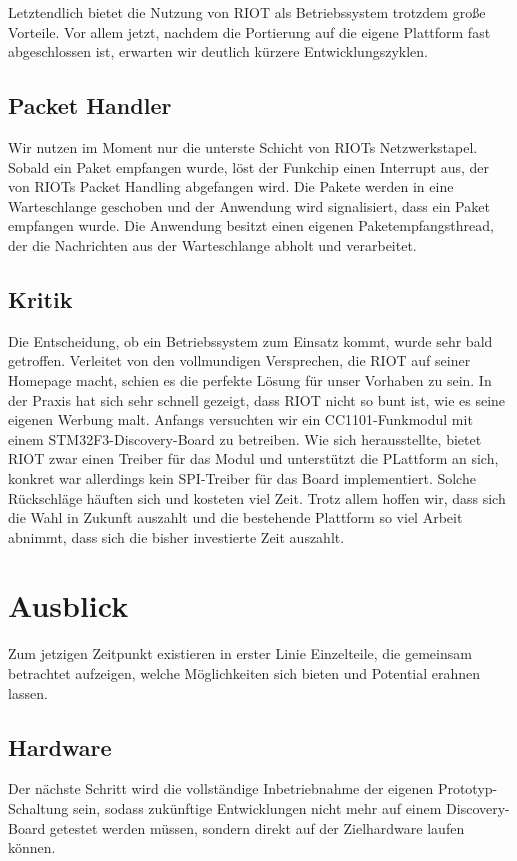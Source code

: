 \documentclass{IEEEtran}
\begin{document}
        Letztendlich bietet die Nutzung von RIOT als Betriebssystem trotzdem
        große Vorteile. Vor allem jetzt, nachdem die Portierung auf die eigene
        Plattform fast abgeschlossen ist, erwarten wir deutlich kürzere
        Entwicklungszyklen.

    \subsection{Packet Handler}
        Wir nutzen im Moment nur die unterste Schicht von RIOTs Netzwerkstapel.
        Sobald ein Paket empfangen wurde, löst der Funkchip einen Interrupt aus,
        der von RIOTs Packet Handling abgefangen wird. Die Pakete werden in eine
        Warteschlange geschoben und der Anwendung wird signalisiert,
        dass ein Paket empfangen wurde.
        Die Anwendung besitzt einen eigenen Paketempfangsthread,
        der die Nachrichten aus der Warteschlange abholt und verarbeitet.


    \subsection{Kritik}
        Die Entscheidung, ob ein Betriebssystem zum Einsatz kommt,
        wurde sehr bald getroffen. Verleitet von den vollmundigen Versprechen,
        die RIOT auf seiner Homepage macht, schien es die perfekte Lösung für
        unser Vorhaben zu sein. In der Praxis hat sich sehr schnell gezeigt,
        dass RIOT nicht so bunt ist, wie es seine eigenen Werbung malt.
        Anfangs versuchten wir ein CC1101-Funkmodul mit einem
        STM32F3-Discovery-Board zu betreiben. Wie sich herausstellte,
        bietet RIOT zwar einen Treiber für das Modul und unterstützt die
        PLattform an sich, konkret war allerdings kein SPI-Treiber für das Board
        implementiert. Solche Rückschläge häuften sich und kosteten viel Zeit.
        Trotz allem hoffen wir, dass sich die Wahl in Zukunft auszahlt und
        die bestehende Plattform so viel Arbeit abnimmt, dass sich die
        bisher investierte Zeit auszahlt.


\section{Ausblick}
    Zum jetzigen Zeitpunkt existieren in erster Linie Einzelteile,
    die gemeinsam betrachtet aufzeigen, welche Möglichkeiten sich bieten
    und Potential erahnen lassen.

    \subsection{Hardware}
        Der nächste Schritt wird die vollständige Inbetriebnahme der eigenen
        Prototyp-Schaltung sein, sodass zukünftige Entwicklungen nicht mehr
        auf einem Discovery-Board getestet werden müssen, sondern direkt auf
        der Zielhardware laufen können.
\end{document}
